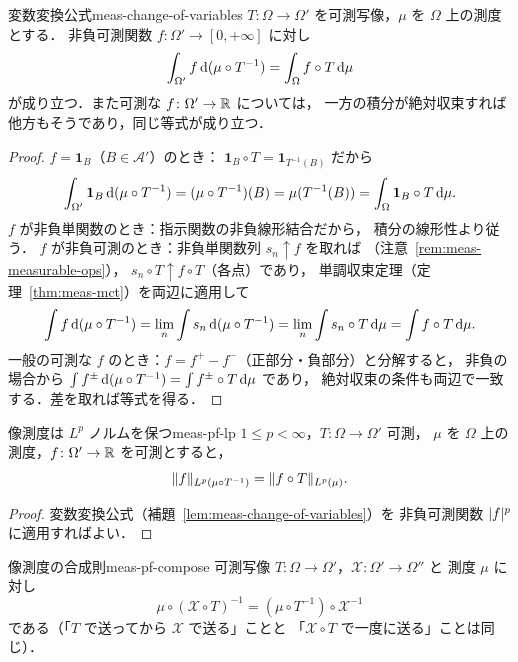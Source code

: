 \begin{lemma}{変数変換公式}{meas-change-of-variables}
  $T\colon\Omega\to\Omega'$ を可測写像，$\mu$ を $\Omega$ 上の測度とする．
  非負可測関数 $f\colon\Omega'\to[0,+\infty]$ に対し
  \[
    \int_{\Omega'}f\,\mathrm{d}(\mu\circ T^{-1})
    =
    \int_\Omega f\circ T\,\mathrm{d}\mu
  \]
  が成り立つ．また可測な $f\colon\Omega'\to\mathbb{R}$ については，
  一方の積分が絶対収束すれば他方もそうであり，同じ等式が成り立つ．
\end{lemma}

\begin{proof}
  $f=\mathbf{1}_B$（$B\in\mathcal{A}'$）のとき：
  $\mathbf{1}_B\circ T=\mathbf{1}_{T^{-1}(B)}$ だから
  \[
    \int_{\Omega'}\mathbf{1}_B\,\mathrm{d}(\mu\circ T^{-1})
    =(\mu\circ T^{-1})(B)
    =\mu(T^{-1}(B))
    =\int_\Omega\mathbf{1}_B\circ T\,\mathrm{d}\mu.
  \]
  $f$ が非負単関数のとき：指示関数の非負線形結合だから，
  積分の線形性より従う．
  $f$ が非負可測のとき：非負単関数列 $s_n\uparrow f$ を取れば
  （注意~\ref{rem:meas-measurable-ops}），
  $s_n\circ T\uparrow f\circ T$（各点）であり，
  単調収束定理（定理~\ref{thm:meas-mct}）を両辺に適用して
  \[
    \int f\,\mathrm{d}(\mu\circ T^{-1})
    =\lim_n\int s_n\,\mathrm{d}(\mu\circ T^{-1})
    =\lim_n\int s_n\circ T\,\mathrm{d}\mu
    =\int f\circ T\,\mathrm{d}\mu.
  \]
  一般の可測な $f$ のとき：$f=f^+-f^-$（正部分・負部分）と分解すると，
  非負の場合から
  $\int f^\pm\,\mathrm{d}(\mu\circ T^{-1})=\int f^\pm\circ T\,\mathrm{d}\mu$ であり，
  絶対収束の条件も両辺で一致する．差を取れば等式を得る．
\end{proof}

\begin{corollary}{像測度は $L^p$ ノルムを保つ}{meas-pf-lp}
  $1\leq p<\infty$，$T\colon\Omega\to\Omega'$ 可測，
  $\mu$ を $\Omega$ 上の測度，$f\colon\Omega'\to\mathbb{R}$ を可測とすると，
  \[
    \lVert f \rVert_{L^p(\mu\circ T^{-1})}
    =
    \lVert f\circ T \rVert_{L^p(\mu)}.
  \]
\end{corollary}

\begin{proof}
  変数変換公式（補題~\ref{lem:meas-change-of-variables}）を
  非負可測関数 $\lvert f \rvert^p$ に適用すればよい．
\end{proof}

\begin{claim}{像測度の合成則}{meas-pf-compose}
  可測写像 $T\colon\Omega\to\Omega'$，$\mathcal{X}\colon\Omega'\to\Omega''$ と
  測度 $\mu$ に対し
  \[
    \mu\circ(\mathcal{X}\circ T)^{-1}=(\mu\circ T^{-1})\circ \mathcal{X}^{-1}
  \]
  である（「$T$ で送ってから $\mathcal{X}$ で送る」ことと
  「$\mathcal{X}\circ T$ で一度に送る」ことは同じ）．
\end{claim}

